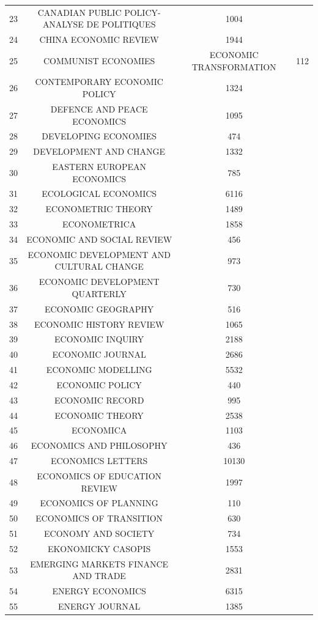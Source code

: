 \begin{tabular}{@{\extracolsep{5pt}} ccc}
23 & CANADIAN PUBLIC POLICY-ANALYSE DE POLITIQUES & 1004 \\ 
24 & CHINA ECONOMIC REVIEW & 1944 \\ 
25 & COMMUNIST ECONOMIES & ECONOMIC TRANSFORMATION & 112 \\ 
26 & CONTEMPORARY ECONOMIC POLICY & 1324 \\ 
27 & DEFENCE AND PEACE ECONOMICS & 1095 \\ 
28 & DEVELOPING ECONOMIES & 474 \\ 
29 & DEVELOPMENT AND CHANGE & 1332 \\ 
30 & EASTERN EUROPEAN ECONOMICS & 785 \\ 
31 & ECOLOGICAL ECONOMICS & 6116 \\ 
32 & ECONOMETRIC THEORY & 1489 \\ 
33 & ECONOMETRICA & 1858 \\ 
34 & ECONOMIC AND SOCIAL REVIEW & 456 \\ 
35 & ECONOMIC DEVELOPMENT AND CULTURAL CHANGE & 973 \\ 
36 & ECONOMIC DEVELOPMENT QUARTERLY & 730 \\ 
37 & ECONOMIC GEOGRAPHY & 516 \\ 
38 & ECONOMIC HISTORY REVIEW & 1065 \\ 
39 & ECONOMIC INQUIRY & 2188 \\ 
40 & ECONOMIC JOURNAL & 2686 \\ 
41 & ECONOMIC MODELLING & 5532 \\ 
42 & ECONOMIC POLICY & 440 \\ 
43 & ECONOMIC RECORD & 995 \\ 
44 & ECONOMIC THEORY & 2538 \\ 
45 & ECONOMICA & 1103 \\ 
46 & ECONOMICS AND PHILOSOPHY & 436 \\ 
47 & ECONOMICS LETTERS & 10130 \\ 
48 & ECONOMICS OF EDUCATION REVIEW & 1997 \\ 
49 & ECONOMICS OF PLANNING & 110 \\ 
50 & ECONOMICS OF TRANSITION & 630 \\ 
51 & ECONOMY AND SOCIETY & 734 \\ 
52 & EKONOMICKY CASOPIS & 1553 \\ 
53 & EMERGING MARKETS FINANCE AND TRADE & 2831 \\ 
54 & ENERGY ECONOMICS & 6315 \\ 
55 & ENERGY JOURNAL & 1385 \\ 

\end{tabular}
